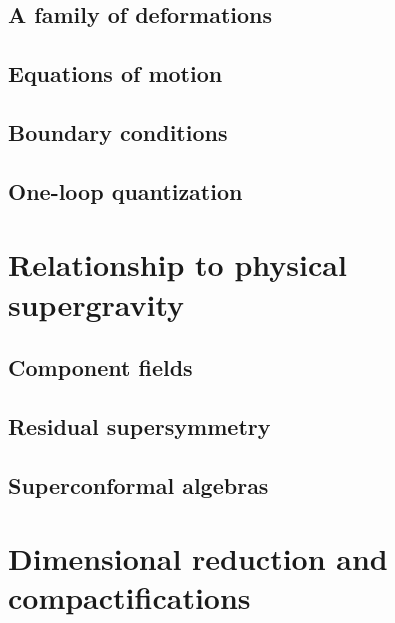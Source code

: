 \documentclass[11pt]{amsart}
\begin{document}
\subsection{A family of deformations} 


\subsection{Equations of motion}


\subsection{Boundary conditions}


\subsection{One-loop quantization} 


\section{Relationship to physical supergravity}

\subsection{Component fields}


\subsection{Residual supersymmetry} 


\subsection{Superconformal algebras}


\section{Dimensional reduction and compactifications} 
\end{document}
